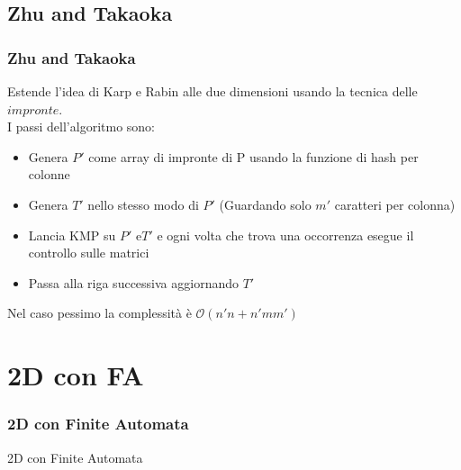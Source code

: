 \documentclass{beamer}
\newcommand{\bigO}{\ensuremath{\mathcal{O}}} %
\begin{document}
\subsection{Zhu and Takaoka}
\begin{frame}
\frametitle{Zhu and Takaoka}

Estende l'idea di Karp e Rabin alle due dimensioni usando la tecnica delle $impronte$.\\
I passi dell'algoritmo sono:
\begin{itemize}
\item Genera $P'$ come array di impronte di P usando la funzione di hash per colonne
\item Genera $T'$ nello stesso modo di $P'$ (Guardando solo $m'$ caratteri per colonna)
\item Lancia KMP su $P'$ e$T'$ e ogni volta che trova una occorrenza esegue il controllo sulle matrici
\item Passa alla riga successiva aggiornando $T'$
\end{itemize}

Nel caso pessimo la complessità è $\bigO{(n'n + n'mm')}$

\end{frame}


\section{2D con FA}

\begin{frame}
\frametitle{2D con Finite Automata}
\Huge{\centerline{2D con Finite Automata}}
\end{frame}
\end{document}
